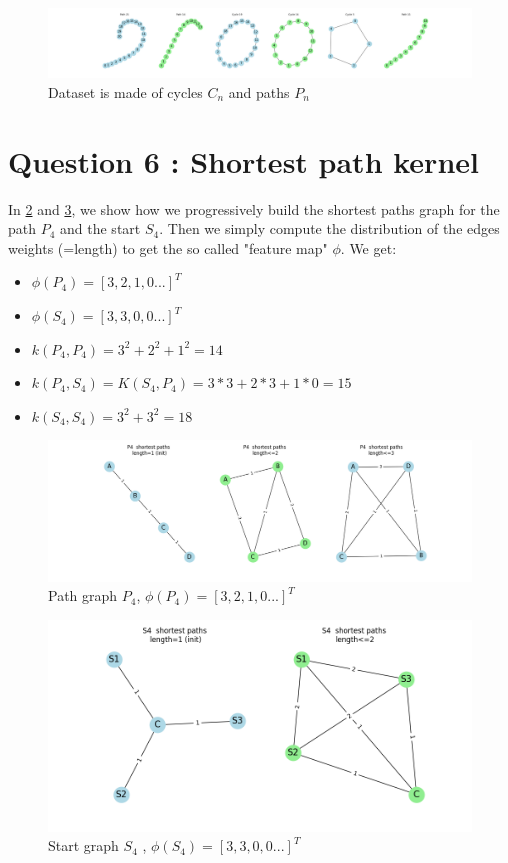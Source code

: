 \documentclass[a4paper]{article}
\begin{document}
\begin{figure}[ht]
        \centering
        \includegraphics[width=1.\textwidth]{figures/cycle_and_paths_dataset.png}
        \caption{Dataset is made of cycles $C_n$ and paths $P_n$}
        \label{fig:cycle_and_paths_dataset}
\end{figure}


\section{Question 6 : Shortest path kernel}
In \ref{fig:P4_shortest_paths_computation} and \ref{fig:S4_shortest_paths_computation}, we show 
how we progressively build the shortest paths graph for the path $P_4$ and the start $S_4$.
Then we simply compute the distribution of the edges weights (=length) to get the so called "feature map" $\phi$.
We get:
\begin{itemize}
    \item $\phi(P_4)=[3, 2, 1, 0 ...]^T$
    \item $\phi(S_4)=[3, 3, 0, 0 ...]^T$
    \item $k(P_4, P_4) = 3^2 + 2^2 + 1^2 = 14$
    \item $k(P_4, S_4) = K(S_4, P_4) = 3*3+2*3+1*0 = 15$
    \item $k(S_4, S_4) = 3^2 + 3^2 = 18$
\end{itemize}

\begin{figure}[ht]
        \centering
        \includegraphics[width=1.\textwidth]{figures/P4_shortest_paths_computation.png}
        \caption{Path graph $P_4$, $\phi(P_4)=[3, 2, 1, 0 ...]^T$}
        \label{fig:P4_shortest_paths_computation}
\end{figure}

\begin{figure}[ht]
    \centering
    \includegraphics[width=.6\textwidth]{figures/S4_shortest_paths_computation.png}
    \caption{Start graph $S_4$ , $\phi(S_4)=[3, 3, 0, 0 ...]^T$}
    \label{fig:S4_shortest_paths_computation}
\end{figure}
\end{document}
